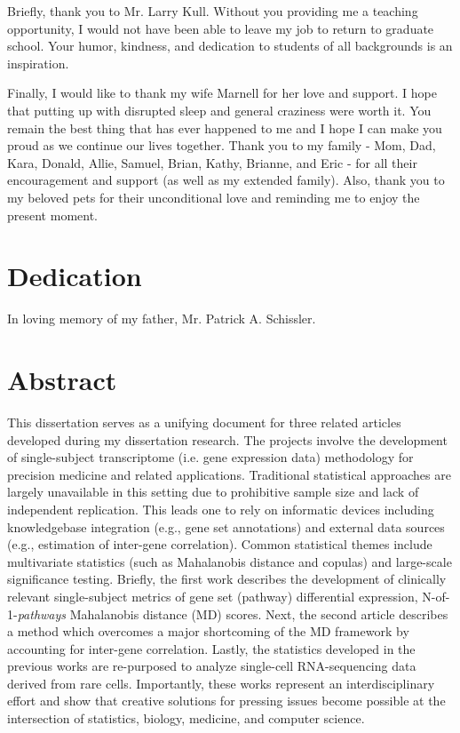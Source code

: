 \documentclass[final]{ua-thesis}
\numberwithin{equation}{section}
\begin{document}
Briefly, thank you to Mr. Larry Kull. Without you providing me a teaching opportunity, I would not have been able to leave my job to return to graduate school. Your humor, kindness, and dedication to students of all backgrounds is an inspiration.

Finally, I would like to thank my wife Marnell for her love and support. I hope that putting up with disrupted sleep and general craziness were worth it. You remain the best thing that has ever happened to me and I hope I can make you proud as we continue our lives together. Thank you to my family - Mom, Dad, Kara, Donald, Allie, Samuel, Brian, Kathy, Brianne, and Eric - for all their encouragement and support (as well as my extended family). Also, thank you to my beloved pets for their unconditional love and reminding me to enjoy the present moment.

\chapter*{Dedication}
\thispagestyle{topright}
\begin{center}In loving memory of my father, Mr. Patrick A. Schissler.\end{center}


\tableofcontents

\listoffigures
\listoftables

\chapter*{Abstract}
\noindent This dissertation serves as a unifying document for three related articles developed during my dissertation research. The projects involve the development of single-subject transcriptome (i.e. gene expression data) methodology for precision medicine and related applications. Traditional statistical approaches are largely unavailable in this setting due to prohibitive sample size and lack of independent replication. This leads one to rely on informatic devices including knowledgebase integration (e.g., gene set annotations) and external data sources (e.g., estimation of inter-gene correlation). Common statistical themes include multivariate statistics (such as Mahalanobis distance and copulas) and large-scale significance testing. Briefly, the first work describes the development of clinically relevant single-subject metrics of gene set (pathway) differential expression, N-of-1-\emph{pathways} Mahalanobis distance (MD) scores. Next, the second article describes a method which overcomes a major shortcoming of the MD framework by accounting for inter-gene correlation. Lastly, the statistics developed in the previous works are re-purposed to analyze single-cell RNA-sequencing data derived from rare cells. Importantly, these works represent an interdisciplinary effort and show that creative solutions for pressing issues become possible at the intersection of statistics, biology, medicine, and computer science.
\end{document}
